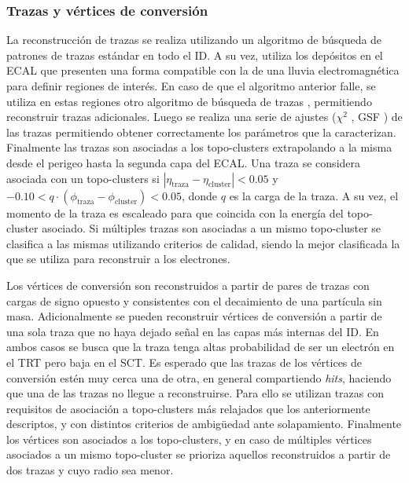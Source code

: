 
\subsubsection{Trazas y vértices de conversión}

La reconstrucción de trazas se realiza utilizando un algoritmo de búsqueda de patrones de trazas estándar
\cite{Cornelissen:1020106, PERF-2017-02, PERF-2017-01} en todo el ID. A su vez, utiliza los depósitos en el ECAL que presenten una forma compatible con la de una lluvia electromagnética para definir regiones de interés. En caso de que el algoritmo anterior falle, se utiliza en estas regiones otro algoritmo de búsqueda de trazas \cite{FRUHWIRTH1987444}, permitiendo reconstruir trazas adicionales. Luego se realiza una serie de ajustes ($\chi^2$ \cite{Cornelissen:1176901}, GSF \cite{ATLAS-CONF-2012-047}) de las trazas permitiendo obtener correctamente los parámetros que la caracterizan. Finalmente las trazas son asociadas a los topo-clusters extrapolando a la misma desde el perigeo hasta la segunda capa del ECAL. Una traza se considera asociada con un topo-clusters si $|\eta_{\text{traza}}-\eta_{\text{cluster}}|<0.05$ y $-0.10<q\cdot(\phi_{\text{traza}}-\phi_{\text{cluster}})<0.05$, donde $q$ es la carga de la traza. A su vez, el momento de la traza es escaleado para que coincida con la energía del topo-cluster asociado. Si múltiples trazas son asociadas a un mismo topo-cluster se clasifica a las mismas utilizando criterios de calidad, siendo la mejor clasificada la que se utiliza para reconstruir a los electrones. 

Los vértices de conversión son reconstruidos a partir de pares de trazas con cargas de signo opuesto y consistentes con el decaimiento de una partícula sin masa. Adicionalmente se pueden reconstruir vértices de conversión a partir de una sola traza que no haya dejado señal en las capas más internas del ID. En ambos casos se busca que la traza tenga altas probabilidad de ser un electrón en el TRT \cite{ATLAS-CONF-2011-128} pero baja en el SCT. Es esperado que las trazas de los vértices de conversión estén muy cerca una de otra, en general compartiendo \textit{hits}, haciendo que una de las trazas no llegue a reconstruirse. Para ello se utilizan trazas con requisitos de asociación a topo-clusters más relajados que los anteriormente descriptos, y con distintos criterios de ambigüedad ante solapamiento. Finalmente los vértices son asociados a los topo-clusters, y en caso de múltiples vértices asociados a un mismo topo-cluster se prioriza aquellos reconstruidos a partir de dos trazas y cuyo radio sea menor.

